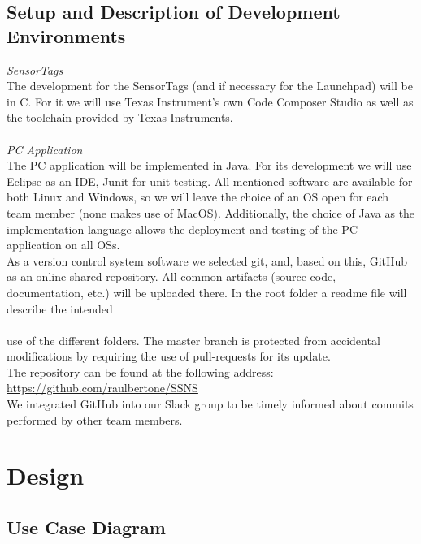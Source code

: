 \documentclass[conference,12pt]{IEEETran}
\begin{document}
\subsection{Setup and Description of Development Environments}
\textit{SensorTags}
\\The development for the SensorTags (and if necessary for the Launchpad) will be in C. For it we will use Texas Instrument’s own Code Composer Studio as well as the toolchain provided by Texas Instruments.\\
\\\textit{PC Application}
\\The PC application will be implemented in Java. For its development we will use Eclipse as an IDE, Junit for unit testing.
All mentioned software are available for both Linux and Windows, so we will leave the choice of an OS open for each team member (none makes use of MacOS). Additionally, the choice of Java as the implementation language allows the deployment and testing of the PC application on all OSs.\\
As a version control system software we selected git, and, based on this, GitHub as an online shared repository. All common artifacts (source code, documentation, etc.) will be uploaded there. In the root folder a readme file will describe the intended\\\\

use of the different folders. The master branch is protected from accidental modifications by requiring the use of pull-requests for its update.\\
The repository can be found at the following address:\\ \url{https://github.com/raulbertone/SSNS}
\\We integrated GitHub into our Slack group to be timely informed about commits performed by other team members.
	

\section{Design}
\subsection{Use Case Diagram}
\end{document}
